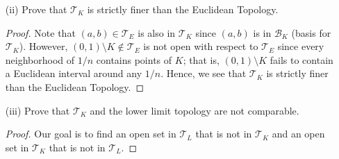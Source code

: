 \documentclass[a4paper]{article}
\begin{document}
\begin{problem}
\begin{enumerate}
\begin{proof}
          Suppose that (2) holds. Then \( A = ({a}_{1}, {b}_{1}) \) and \( B = ({a}_{2}, {b}_{2}) \setminus  K  \). Note that  
          \[  A \cap B = A \cap (B \setminus  K) = (A \cap B) \setminus  K.  \]
          Using the same \( m \) and \( \ell  \) from (1), it follows that \( ({a}_{1}, {b}_{1}) \cap ({a}_{2}, {b}_{2}) = (m, \ell)  \). Choosing \( \epsilon = \frac{ 1 }{ 2 }  \min \{ x - m , \ell - x  \}  \), it follows that \( (x-  \epsilon, x + \epsilon) \subseteq (m,\ell) \). Define \( C = (x- \epsilon, x + \epsilon) \setminus  K  \) which is in \( {\mathcal{B}}_{K} \). Then \( x \in C \subseteq (m,\ell) \subseteq A \cap B \) and we are done.

          (3) Suppose \( A,B \in \{ (a,b) \setminus  K : a,b \in \R , a < b  \} \). Then \( A = ({a}_{1}, {b}_{1}) \setminus  K   \) and \( B = ({a}_{2}, {b}_{2}) \setminus  K  \).  Then we have         
          \begin{align*}
              A \cap B &= \Big( ({a}_{1}, {b}_{1}) \setminus  K  \Big) \cap \Big( ({a}_{2}, {b}_{2}) \setminus  K  \Big) \\
                       &= \Big[({a}_{1}, {b}_{1}) \cap ({a}_{2}, {b}_{2}) \Big] \setminus  K \\ 
                       &= (m,\ell) \setminus  K. 
          \end{align*}
          Using the same choice of \( \epsilon  \) as in the previous case, we can define \( C = (x- \epsilon, x + \epsilon) \setminus  K    \) which is a subset of \( A \cap B \). Hence, \( x \in C \subseteq A \cap B  \) and we are done.
        Now, (I) and (II) imply that \( {\mathcal{B}}_{K} \) is a basis for sometopology on \( \R  \). 
           \end{proof}
        \item[(ii)] Prove that \( {\mathcal{T}}_{K}  \) is strictly finer than the Euclidean Topology.
            \begin{proof}
                Note that \( (a,b) \in {\mathcal{T}}_{E} \) is also in \( {\mathcal{T}}_{K} \) since \( (a,b)  \) is in \( \mathcal{B}_{K} \) (basis for \( {\mathcal{T}}_{K} \)). However, \( (0,1) \setminus  K \notin {\mathcal{T}}_{E} \) is not open with respect to \( {\mathcal{T}}_{E} \) since every neighborhood of \( 1/n \) contains points of \( K  \); that is, \( (0,1) \setminus  K   \) fails to contain a Euclidean interval around any \( 1/n \). Hence, we see that \( {\mathcal{T}}_{K} \) is strictly finer than the Euclidean Topology.
            \end{proof}
        \item[(iii)] Prove that \( {\mathcal{T}}_{K }  \) and the lower limit topology
             are not comparable.
             \begin{proof}
                 Our goal is to find an open set in \( {\mathcal{T}}_{L} \) that is not in \( {\mathcal{T}}_{K} \) and an open set in \( {\mathcal{T}}_{K} \) that is not in \( {\mathcal{T}}_{L} \).  


\end{proof}
\end{enumerate}
\end{problem}
\end{document}
